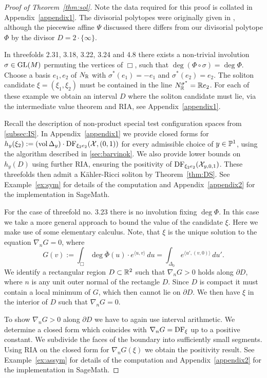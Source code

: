\begin{proof}[Proof of Theorem~\ref{thm:sol}]
Note the data required for this proof is collated in Appendix~\ref{appendix1}. The divisorial polytopes were originally given in \cite{suss2013fano}, although the piecewise affine \(\Psi\) discussed there differs from our divisorial polytope \(\Phi\) by the divisor \(D = 2 \cdot \{ \infty \}\).

In threefolds 2.31, 3.18, 3.22, 3.24 and 4.8 there exists a non-trivial involution \(\sigma \in \operatorname{GL}(M)\) permuting the vertices of \(\Box\), such that \(\deg (\Phi \circ \sigma) = \deg \Phi\). Choose a basis $e_1, e_2$ of $N_{\mathbb{R}}$ with $\sigma^*(e_1)=-e_1$ and $\sigma^*(e_2)=e_2$. The soliton candidate $\xi = (\xi_1,\xi_2)$ must be contained in the line $N_{\mathbb{R}}^{\sigma^*} = \mathbb{R} e_2$. For each of these example we obtain an interval \(D\) where the soliton candidate must lie, via the intermediate value theorem and RIA, see Appendix~\ref{appendix1}.

Recall the description of non-product special test configuration spaces from \ref{subsec:IS}. In Appendix~\ref{appendix1} we provide closed forms for \(h_y(\xi_2) := (\mathop{\rm vol}\nolimits \Delta_y) \cdot \mathop{\rm DF}\nolimits_{\xi_2 e_2}({\mathcal{X}},(0,1))\) for every admissible choice of $y \in \mathbb{P}^1$, using the algorithm described in \ref{sec:barvinok}. We also provide lower bounds on \(h_y(D)\) using further RIA, ensuring the positivity of $\mathop{\rm DF}\nolimits_{\xi_2 e_2}({\mathcal{X}}_{y,0,1})$. These threefolds then admit a K\"ahler-Ricci soliton by Theorem~\ref{thm:DS}. See Example~\ref{ex:sym} for details of the computation and Appendix~\ref{appendix2} for the implementation in SageMath.

For the case of threefold no. 3.23 there is no involution fixing $\deg \Phi$. In this case we take a more general approach to bound the value of the candidate \(\xi\). Here we make use of some elementary calculus. Note, that \(\xi\) is the unique solution to the equation \(\nabla_n G = 0 \), where 
\[
G(v) := \int_{\Box} \deg \bar \Phi(u) \cdot e^{\langle u, v \rangle}\, du = 
\int_{\Delta_0} e^{\langle u', (v,0) \rangle} \, du'.
\]
We identify a rectangular region \(D \subset \mathbb{R}^2 \) such that \(\nabla_n G > 0 \) holds along \(\partial D\), where \(n\) is any unit outer normal of the rectangle \(D\). Since $D$ is compact it must contain a local minimum of $G$, which then cannot lie on \(\partial D\). We then have \(\xi\) in the interior of \(D\) such that \(\nabla_n G = 0\).

To show $\nabla_n G >0 $ along $\partial D$ we have to again use interval arithmetic. We determine a closed form which coincides with $\nabla_n G = \mathop{\rm DF}\nolimits_\xi$ up to a positive constant. We subdivide the faces of the boundary into sufficiently small segments. Using RIA on the closed form for $\nabla_n G(\xi)$ we obtain the positivity result. See Example~\ref{ex:assym} for details of the computation and Appendix~\ref{appendix2} for the implementation in SageMath.
\end{proof}
